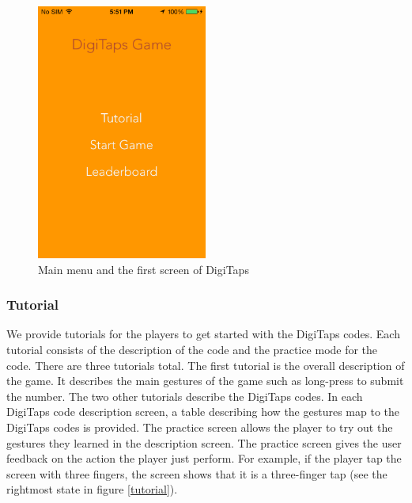 \begin{figure}[ht!]
  \centering
  \includegraphics[width=0.5\textwidth]{figures/start.png}
  \caption{Main menu and the first screen of DigiTaps}
  \label{startscreen}
\end{figure}

\subsubsection{Tutorial}
    We provide tutorials for the players to get started with the DigiTaps codes. Each tutorial consists of the description of the code and the practice mode for the code. There are three tutorials total. The first tutorial is the overall description of the game. It describes the main gestures of the game such as long-press to submit the number. The two other tutorials describe the DigiTaps codes. In each DigiTaps code description screen, a table describing how the gestures map to the DigiTaps codes is provided. The practice screen allows the player to try out the gestures they learned in the description screen. The practice screen gives the user feedback on the action the player just perform. For example, if the player tap the screen with three fingers, the screen shows that it is a three-finger tap (see the rightmost state in figure \ref{tutorial}).

